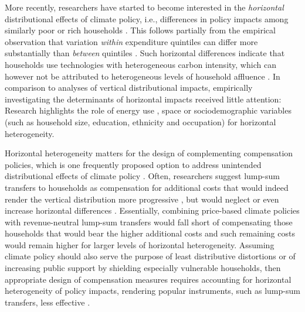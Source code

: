 \documentclass[12pt, a4paper]{article}
\begin{document}
More recently, researchers have started to become interested in the \textit{horizontal} distributional effects of climate policy, i.e., differences in policy impacts among similarly poor or rich households \autocite{Rausch.2011,Fischer.2019}. This follows partially from the empirical observation that variation \textit{within} expenditure quintiles can differ more substantially than \textit{between} quintiles \autocite{Cronin.2019,Steckel.2021b,Pizer.2019}. Such horizontal differences indicate that households use technologies with heterogeneous carbon intensity, which can however not be attributed to heterogeneous levels of household affluence \autocite{Hansel.2022}. In comparison to analyses of vertical distributional impacts, empirically investigating the determinants of horizontal impacts received little attention: Research highlights the role of energy use \autocite{Steckel.2021b,Missbach.2024}, space \autocite{Chan.2023,Burtraw.2009} or sociodemographic variables (such as household size, education, ethnicity and occupation) \autocite{Grainger.2010,Buchs.2013,Farrell.2017,Missbach.2023,Fremstad.2019} for horizontal heterogeneity.

Horizontal heterogeneity matters for the design of complementing compensation policies, which is one frequently proposed option to address unintended distributional effects of climate policy \autocite{Klenert.2018,Baranzini.2017}. Often, researchers suggest lump-sum transfers to households as compensation for additional costs \autocite{Stiglitz.2017,Baranzini.2000,Metcalf.2009} that would indeed render the vertical distribution more progressive \autocite{Budolfson.2021,vanderPloeg.2022}, but would neglect or even increase horizontal differences \autocite{Cronin.2019,Hansel.2022}. Essentially, combining price-based climate policies with revenue-neutral lump-sum transfers would fall short of compensating those households that would bear the higher additional costs and such remaining costs would remain higher for larger levels of horizontal heterogeneity. Assuming climate policy should also serve the purpose of least distributive distortions \autocite{Fischer.2019} or of increasing public support by shielding especially vulnerable households, then appropriate design of compensation measures requires accounting for horizontal heterogeneity of policy impacts, rendering popular instruments, such as lump-sum transfers, less effective \autocite{Fullerton.2019,Missbach.2024}. 
\end{document}
